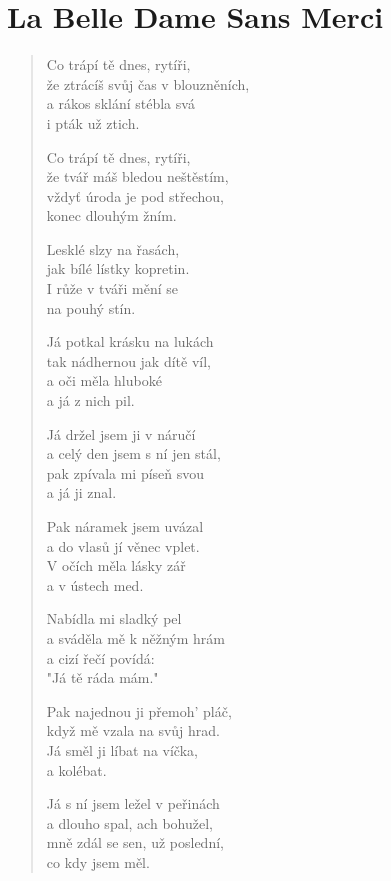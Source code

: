 \section{La Belle Dame Sans Merci}

\begin{multicols}{2}
	\begin{verse}
		Co trápí tě dnes, rytíři, \\
		že ztrácíš svůj čas v blouzněních,  \\
		a rákos sklání stébla svá  \\
		i pták už ztich.
		
		Co trápí tě dnes, rytíři,  \\
		že tvář máš bledou neštěstím,\\  
		vždyť úroda je pod střechou,  \\
		konec dlouhým žním.
		
		Lesklé slzy na řasách,  \\
		jak bílé lístky kopretin. \\ 
		I růže v tváři mění se  \\
		na pouhý stín.
		
		Já potkal krásku na lukách\\  
		tak nádhernou jak dítě víl, \\ 
		a oči měla hluboké  \\
		a já z nich pil.
		
		Já držel jsem ji v náručí\\  
		a celý den jsem s ní jen stál,  \\
		pak zpívala mi píseň svou  \\
		a já ji znal.
		
		Pak náramek jsem uvázal  \\
		a do vlasů jí věnec vplet. \\ 
		V očích měla lásky zář  \\
		a v ústech med.
		
		Nabídla mi sladký pel  \\
		a sváděla mě k něžným hrám  \\
		a cizí řečí povídá:  \\
		"Já tě ráda mám."
		
		Pak najednou ji přemoh' pláč,  \\
		když mě vzala na svůj hrad.  \\
		Já směl ji líbat na víčka,  \\
		a kolébat.
		
		Já s ní jsem ležel v peřinách \\ 
		a dlouho spal, ach bohužel,  \\
		mně zdál se sen, už poslední,  \\
		co kdy jsem měl.
		

\end{verse}
\end{multicols}
